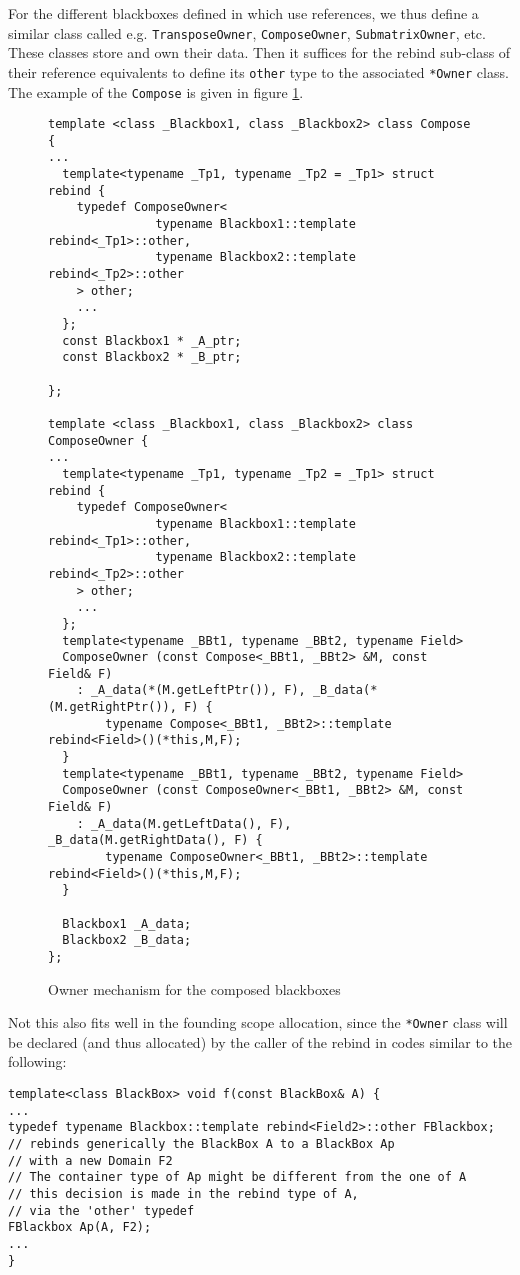 For the different blackboxes defined in \linbox which use references,
we thus define a similar class called e.g. \texttt{TransposeOwner},
\texttt{ComposeOwner}, \texttt{SubmatrixOwner}, etc.
These classes store and own their data. Then it suffices for the
rebind sub-class of their reference equivalents to define its
\texttt{other} type to the associated \verb!*Owner! class. The example
of the \texttt{Compose} is given in figure \ref{fig:composeowner}.
\begin{figure}[htbp]
\begin{verbatim}
template <class _Blackbox1, class _Blackbox2> class Compose {
...
  template<typename _Tp1, typename _Tp2 = _Tp1> struct rebind {
    typedef ComposeOwner<
               typename Blackbox1::template rebind<_Tp1>::other,
               typename Blackbox2::template rebind<_Tp2>::other
    > other;
    ...
  };
  const Blackbox1 * _A_ptr;
  const Blackbox2 * _B_ptr;
  
};

template <class _Blackbox1, class _Blackbox2> class ComposeOwner {
...
  template<typename _Tp1, typename _Tp2 = _Tp1> struct rebind {
    typedef ComposeOwner<
               typename Blackbox1::template rebind<_Tp1>::other,
               typename Blackbox2::template rebind<_Tp2>::other
    > other;
    ...
  };
  template<typename _BBt1, typename _BBt2, typename Field>
  ComposeOwner (const Compose<_BBt1, _BBt2> &M, const Field& F)
    : _A_data(*(M.getLeftPtr()), F), _B_data(*(M.getRightPtr()), F) {
        typename Compose<_BBt1, _BBt2>::template rebind<Field>()(*this,M,F);
  }
  template<typename _BBt1, typename _BBt2, typename Field>
  ComposeOwner (const ComposeOwner<_BBt1, _BBt2> &M, const Field& F)
    : _A_data(M.getLeftData(), F), _B_data(M.getRightData(), F) {
        typename ComposeOwner<_BBt1, _BBt2>::template rebind<Field>()(*this,M,F);
  }

  Blackbox1 _A_data;
  Blackbox2 _B_data;
};
\end{verbatim}
\caption{Owner mechanism for the composed blackboxes}\label{fig:composeowner}
\end{figure}

Not this also fits well in the \linbox
founding scope allocation, since the \verb!*Owner! class will be
declared (and thus allocated) by the caller of the rebind in codes
similar to the following:
\begin{verbatim}
template<class BlackBox> void f(const BlackBox& A) {
...
typedef typename Blackbox::template rebind<Field2>::other FBlackbox;
// rebinds generically the BlackBox A to a BlackBox Ap 
// with a new Domain F2
// The container type of Ap might be different from the one of A
// this decision is made in the rebind type of A, 
// via the 'other' typedef
FBlackbox Ap(A, F2);
...
}
\end{verbatim}

